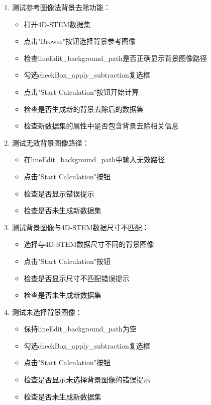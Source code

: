 \documentclass[a4paper,12pt]{report}	%
\begin{document}
\begin{enumerate}
    \item 测试参考图像法背景去除功能：
    \begin{itemize}
        \item 打开4D-STEM数据集
        \item 点击"Browse"按钮选择背景参考图像
        \item 检查lineEdit\_background\_path是否正确显示背景图像路径
        \item 勾选checkBox\_apply\_subtraction复选框
        \item 点击"Start Calculation"按钮开始计算
        \item 检查是否生成新的背景去除后的数据集
        \item 检查新数据集的属性中是否包含背景去除相关信息
    \end{itemize}

    \item 测试无效背景图像路径：
    \begin{itemize}
        \item 在lineEdit\_background\_path中输入无效路径
        \item 点击"Start Calculation"按钮
        \item 检查是否显示错误提示
        \item 检查是否未生成新数据集
    \end{itemize}

    \item 测试背景图像与4D-STEM数据尺寸不匹配：
    \begin{itemize}
        \item 选择与4D-STEM数据尺寸不同的背景图像
        \item 点击"Start Calculation"按钮
        \item 检查是否显示尺寸不匹配错误提示
        \item 检查是否未生成新数据集
    \end{itemize}

    \item 测试未选择背景图像：
    \begin{itemize}
        \item 保持lineEdit\_background\_path为空
        \item 勾选checkBox\_apply\_subtraction复选框
        \item 点击"Start Calculation"按钮
        \item 检查是否显示未选择背景图像的错误提示
        \item 检查是否未生成新数据集
    \end{itemize}


\end{enumerate}
\end{document}
